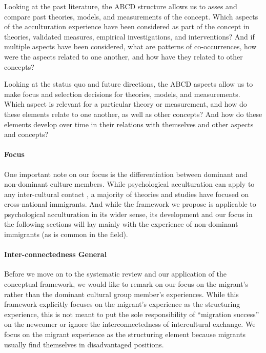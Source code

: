 \documentclass[man, 12pt, a4paper]{apa7}
\begin{document}
Looking at the past literature, the ABCD structure allows us to asses and compare past theories, models, and measurements of the concept. Which aspects of the acculturation experience have been considered as part of the concept in theories, validated measures, empirical investigations, and interventions? And if multiple aspects have been considered, what are patterns of co-occurrences, how were the aspects related to one another, and how have they related to other concepts?

Looking at the status quo and future directions, the ABCD aspects allow us to make focus and selection decisions for theories, models, and measurements. Which aspect is relevant for a particular theory or measurement, and how do these elements relate to one another, as well as other concepts? And how do these elements develop over time in their relations with themselves and other aspects and concepts?

\paragraph{Focus}
One important note on our focus is the differentiation between dominant and non-dominant culture members. While psychological acculturation can apply to any inter-cultural contact \citep[including, for example, the contact between indigenous people and colonial settlers, e.g.,][]{Berry1974}, a majority of theories and studies have focused on cross-national immigrants. And while the framework we propose is applicable to psychological acculturation in its wider sense, its development and our focus in the following sections will lay mainly with the experience of non-dominant immigrants (as is common in the field).

\paragraph{Inter-connectedness General}
Before we move on to the systematic review and our application of the conceptual framework, we would like to remark on our focus on the migrant's rather than the dominant cultural group member's experiences. 
While this framework explicitly focuses on the migrant's experience as the structuring experience, this is not meant to put the sole responsibility of ``migration success'' on the newcomer or ignore the interconnectedness of intercultural exchange. We focus on the migrant experience as the structuring element because migrants usually find themselves in disadvantaged positions. 
\end{document}
